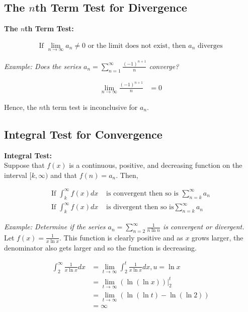     \subsection{The $n$th Term Test for Divergence}
        \color{purple} \textbf{The $n$th Term Test:} \color{black}

        \begin{align*}
            \text{If } \lim_{n\to\infty}a_n\not = 0 \text{ or the limit does not exist, then }
            a_n \text{ diverges}
        \end{align*}

        \noindent \color{blue} \textit{Example: Does the series $a_n=\sum^\infty_{n=1}\frac{(-1)^{n+1}}{n}$
        converge?} \color{black}

        \begin{align*}
            \lim_{n\to\infty}\frac{(-1)^{n+1}}{n} &= 0
        \end{align*}

        \noindent Hence, the $n$th term test is inconclusive for $a_n$.

    \subsection{Integral Test for Convergence}
        \color{purple} \textbf{Integral Test:} \color{black} \\

        \noindent Suppose that $f(x)$ is a continuous, positive, and decreasing function on the
        interval $[k,\infty)$ and that $f(n)=a_n$. Then,

        \begin{align*}
            \text{If }\int^\infty_k f(x)dx & \text{ is convergent then so is } \sum^\infty_{n=k}a_n \\
            \text{If }\int^\infty_k f(x)dx & \text{ is divergent then so is} \sum^\infty_{n=k}a_n
        \end{align*}

        \noindent \color{blue} \textit{Example: Determine if the series $a_n=\sum^\infty_{n=2}
        \frac{1}{n\ln{n}}$ is convergent or divergent.} \color{black} \\

        \noindent Let $f(x)=\frac{1}{x\ln{x}}$. This function is clearly positive and as $x$ grows
        larger, the denominator also gets larger and so the function is decreasing.

        \begin{align*}
            \int^\infty_{2} \frac{1}{x\ln{x}}dx     &= \lim_{t\to\infty}\int^t_2 \frac{1}{x\ln{x}}dx,
                                                    u=\ln{x} \\
                                                    &= \lim_{t\to\infty}(\ln(\ln{x}))\Big|^t_2 \\
                                                    &= \lim_{t\to\infty}(\ln(\ln{t})-\ln(\ln{2})) \\
                                                    &= \infty
        \end{align*}

